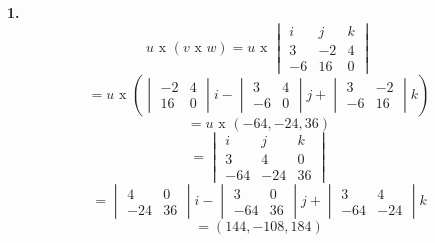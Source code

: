 \documentclass{article}
\begin{document}
   \textbf{1.}
   $$u \text{ x }(v \text{ x } w) = u \text{ x } \begin{vmatrix}
       i & j & k \\
       3 &-2& 4 \\
       -6& 16 & 0
   \end{vmatrix}$$
   $$= u \text{ x }\left(\begin{vmatrix}
       -2 & 4 \\
       16 & 0
   \end{vmatrix}i - \begin{vmatrix}
       3 & 4 \\
       -6 & 0
   \end{vmatrix}j + \begin{vmatrix}
       3 & -2 \\
       -6 & 16
   \end{vmatrix}k\right)$$
   $$= u \text{ x }(-64, -24, 36)$$
   $$=\begin{vmatrix}
       i & j & k \\
       3 & 4 & 0 \\
       -64 & -24 & 36
   \end{vmatrix}$$
   $$ = \begin{vmatrix}
       4 & 0 \\
       -24 & 36
   \end{vmatrix}i - \begin{vmatrix}
       3 & 0 \\
       -64 & 36
   \end{vmatrix}j + \begin{vmatrix}
       3 & 4 \\
       -64 & -24
   \end{vmatrix}k$$
   $$=(144, -108, 184)$$
\end{document}
